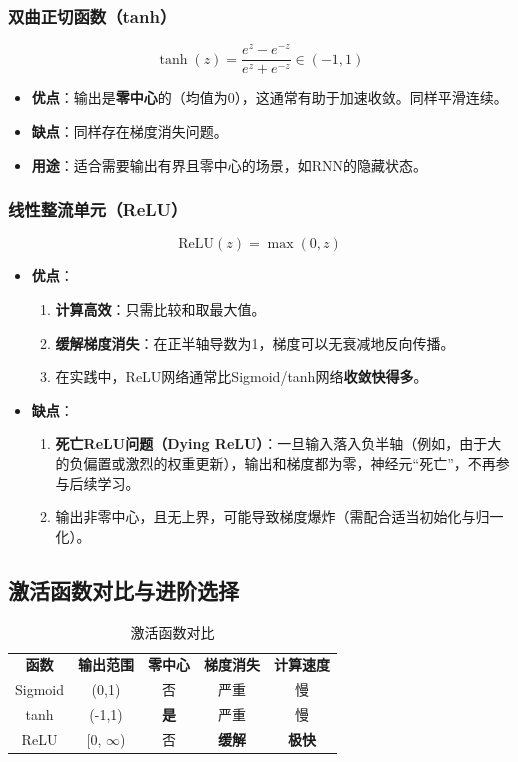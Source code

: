 \subsubsection{双曲正切函数（tanh）}
\[
\tanh(z) = \frac{e^{z} - e^{-z}}{e^{z} + e^{-z}} \in (-1, 1)
\]
\begin{itemize}
    \item \textbf{优点}：输出是\textbf{零中心}的（均值为0），这通常有助于加速收敛。同样平滑连续。
    \item \textbf{缺点}：同样存在梯度消失问题。
    \item \textbf{用途}：适合需要输出有界且零中心的场景，如RNN的隐藏状态。
\end{itemize}

\subsubsection{线性整流单元（ReLU）}
\[
\text{ReLU}(z) = \max(0, z)
\]
\begin{itemize}
    \item \textbf{优点}：
    \begin{enumerate}
        \item \textbf{计算高效}：只需比较和取最大值。
        \item \textbf{缓解梯度消失}：在正半轴导数为1，梯度可以无衰减地反向传播。
        \item 在实践中，ReLU网络通常比Sigmoid/tanh网络\textbf{收敛快得多}。
    \end{enumerate}
    \item \textbf{缺点}：
    \begin{enumerate}
        \item \textbf{死亡ReLU问题（Dying ReLU）}：一旦输入落入负半轴（例如，由于大的负偏置或激烈的权重更新），输出和梯度都为零，神经元“死亡”，不再参与后续学习。
        \item 输出非零中心，且无上界，可能导致梯度爆炸（需配合适当初始化与归一化）。
    \end{enumerate}
\end{itemize}

\subsection{激活函数对比与进阶选择}

\begin{table}[h]
\centering
\caption{激活函数对比}
\begin{tabular}{|c|c|c|c|c|}
\textbf{函数} & \textbf{输出范围} & \textbf{零中心} & \textbf{梯度消失} & \textbf{计算速度} \\
Sigmoid & (0,1) & 否 & 严重 & 慢 \\
tanh & (-1,1) & \textbf{是} & 严重 & 慢 \\
ReLU & [0, $\infty$) & 否 & \textbf{缓解} & \textbf{极快} \\
\end{tabular}
\end{table}

